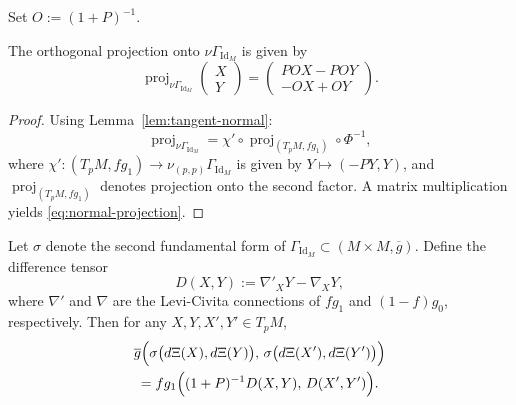 \documentclass[graybox]{svmult}
\begin{document}
Set $O := (1+P)^{-1}$.

\begin{lemma}\label{lem:normal-projection}
The orthogonal projection onto $\nu\Gamma_{\operatorname{Id}_M}$ is given by
\begin{equation}\label{eq:normal-projection}
\operatorname{proj}_{\nu\Gamma_{\operatorname{Id}_M}}\begin{pmatrix}X\\Y\end{pmatrix} = 
\begin{pmatrix}
P O X - P O Y \\[2pt]
-O X + O Y
\end{pmatrix}.
\end{equation}
\end{lemma}

\begin{proof}
Using Lemma~\ref{lem:tangent-normal}:
\[
\operatorname{proj}_{\nu\Gamma_{\operatorname{Id}_M}} = \chi'\circ\operatorname{proj}_{(T_pM,fg_1)}\circ\Phi^{-1},
\]
where $\chi' : (T_pM,fg_1) \to \nu_{(p,p)}\Gamma_{\operatorname{Id}_M}$ is given by $Y \mapsto (-PY, Y)$, and $\operatorname{proj}_{(T_pM,fg_1)}$ denotes projection onto the second factor. A matrix multiplication yields \eqref{eq:normal-projection}.
\end{proof}

\begin{lemma}\label{lem:shape-operator}
Let $\sigma$ denote the second fundamental form of $\Gamma_{\operatorname{Id}_M}\subset(M\times M,\overline{g})$. Define the difference tensor
\[
D(X,Y) := \nabla'_X Y - \nabla_X Y,
\]
where $\nabla'$ and $\nabla$ are the Levi-Civita connections of $fg_1$ and $(1-f)g_0$, respectively. Then for any $X,Y,X',Y'\in T_pM$,
\begin{multline}\label{eq:shape-formula}
\overline{g}\Bigl(\sigma\bigl(d\Xi(X),d\Xi(Y)\bigr),\,
\sigma\bigl(d\Xi(X'),d\Xi(Y')\bigr)\Bigr) \\
= fg_1\Bigl((1+P)^{-1}D(X,Y),\, D(X',Y')\Bigr).
\end{multline}
\end{lemma}
\end{document}
